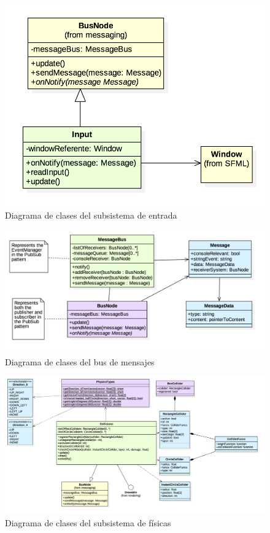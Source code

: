 \begin{figure}
	\centerline{\includegraphics[width=12cm]{otros/UML/png/alld/png/input__diagramaDeClases_input_8.png}}
	\caption{Diagrama de clases del subsistema de entrada}
	\label{class:input}
\end{figure}

\begin{figure}
	\centerline{\includegraphics[width=15cm]{otros/UML/png/alld/png/messaging__diagramaDeClases_messaging_11.png}}
	\caption{Diagrama de clases del bus de mensajes}
	\label{class:messageBus}
\end{figure}

\begin{figure}
	\centerline{\includegraphics[width=18cm]{otros/UML/png/alld/png/physics__diagramaDeClases_physics_2.png}}
	\caption{Diagrama de clases del subsistema de físicas}
	\label{class:collisions}
\end{figure}


